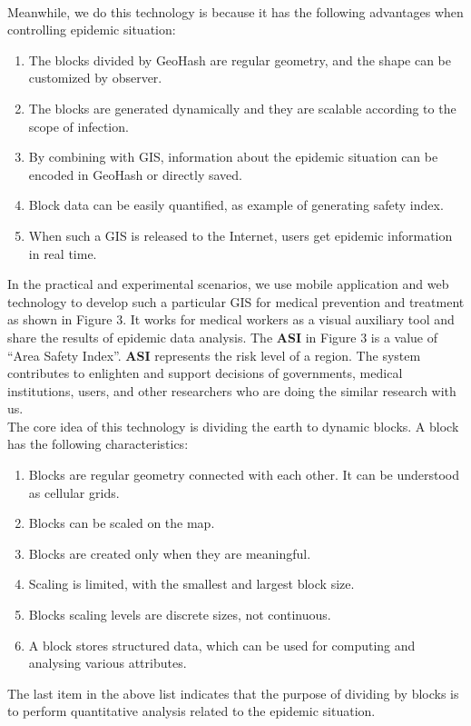 \documentclass[sigplan,screen]{acmart}
\begin{document}
\\
Meanwhile, we do this technology is because it has the following advantages when controlling epidemic situation:
\begin{enumerate}
	\item The blocks divided by GeoHash are regular geometry, and the shape can be customized by observer.
	\item The blocks are generated dynamically and they are scalable according to the scope of infection.
	\item By combining with GIS, information about the epidemic situation can be encoded in GeoHash or directly saved.
	\item Block data can be easily quantified, as example of generating safety index.
	\item When such a GIS is released to the Internet, users get epidemic information in real time.
\end{enumerate}
In the practical and experimental scenarios, we use mobile application and web technology to develop such a particular GIS for medical prevention and treatment as shown in Figure 3. It works for medical workers as a visual auxiliary tool and share the results of epidemic data analysis. The \textbf{ASI} in Figure 3 is a value of ``Area Safety Index''. \textbf{ASI} represents the risk level of a region. The system contributes to enlighten and support decisions of governments, medical institutions, users, and other researchers who are doing the similar research with us.
\\
The core idea of this technology is dividing the earth to dynamic blocks. A block has the following characteristics:
\begin{enumerate}
	\item Blocks are regular geometry connected with each other. It can be understood as cellular grids.
	\item Blocks can be scaled on the map.
	\item Blocks are created only when they are meaningful.
	\item Scaling is limited, with the smallest and largest block size.
	\item Blocks scaling levels are discrete sizes, not continuous.
	\item A block stores structured data, which can be used for computing and analysing various attributes.
\end{enumerate}
The last item in the above list indicates that the purpose of dividing by blocks is to perform quantitative analysis related to the epidemic situation.
\end{document}
